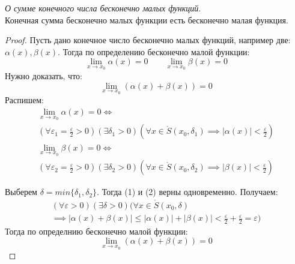 \begin{theorem}
  \textit{О сумме конечного числа бесконечно малых функций}. \\
  Конечная сумма бесконечно малых функции есть бесконечно малая функция.
\end{theorem}
\begin{proof}
  Пусть дано конечное число бесконечно малых функций, например две: $\alpha(x), \beta(x)$.
  Тогда по определению бесконечно малой функции:
  \[
  \lim_{x \to x_0} \alpha(x) = 0 \qquad \lim_{x \to x_0} \beta(x) = 0
  \] 
  Нужно доказать, что:
  \[
  \lim_{x \to x_0} (\alpha(x) + \beta(x)) = 0
  \] 
  Распишем:
  \begin{gather*}
    \lim_{x \to x_0} \alpha(x) = 0 \iff \\
    (\forall \varepsilon_1 = \frac{\varepsilon}{2} > 0)(\exists \delta_1 > 0)(\forall x \in \mathring{S}(x_0, \delta_1) \implies |\alpha(x)| < \frac{\varepsilon}{2}) \tag{1}\\
    \lim_{x \to x_0} \beta(x) = 0 \iff \\
    (\forall \varepsilon_2 = \frac{\varepsilon}{2} > 0)(\exists \delta_2 > 0)(\forall x \in \mathring{S}(x_0, \delta_2) \implies |\beta(x)| < \frac{\varepsilon}{2}) \tag{2}
  \end{gather*}

  Выберем $\delta = min \{\delta_1, \delta_2\}$. Тогда (1) и (2) верны одновременно. Получаем:
  \begin{gather*}
    (\forall \varepsilon > 0)(\exists \delta > 0)(\forall x \in \mathring{S}(x_0, \delta) \\ \implies |\alpha(x) + \beta(x)| \le |\alpha(x)| + |\beta(x)| < \frac{\varepsilon}{2} + \frac{\varepsilon}{2} = \varepsilon) 
  \end{gather*}
  Тогда по определнию бесконечно малой функции:
  \[
  \lim_{x \to x_0} (\alpha(x) + \beta(x)) = 0
  \] 
\end{proof}

